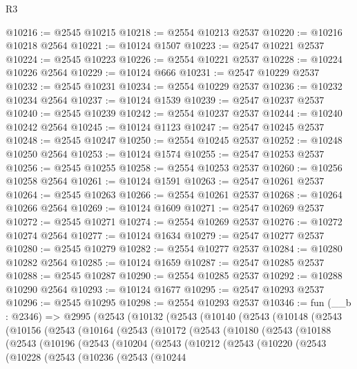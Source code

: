 \begin{lexlean}{R3}
\begin{coremodule}
@10216 := @2545 @10215
@10218 := @2554 @10213 @2537
@10220 := @10216 @10218 @2564
@10221 := @10124 @1507
@10223 := @2547 @10221 @2537
@10224 := @2545 @10223
@10226 := @2554 @10221 @2537
@10228 := @10224 @10226 @2564
@10229 := @10124 @666
@10231 := @2547 @10229 @2537
@10232 := @2545 @10231
@10234 := @2554 @10229 @2537
@10236 := @10232 @10234 @2564
@10237 := @10124 @1539
@10239 := @2547 @10237 @2537
@10240 := @2545 @10239
@10242 := @2554 @10237 @2537
@10244 := @10240 @10242 @2564
@10245 := @10124 @1123
@10247 := @2547 @10245 @2537
@10248 := @2545 @10247
@10250 := @2554 @10245 @2537
@10252 := @10248 @10250 @2564
@10253 := @10124 @1574
@10255 := @2547 @10253 @2537
@10256 := @2545 @10255
@10258 := @2554 @10253 @2537
@10260 := @10256 @10258 @2564
@10261 := @10124 @1591
@10263 := @2547 @10261 @2537
@10264 := @2545 @10263
@10266 := @2554 @10261 @2537
@10268 := @10264 @10266 @2564
@10269 := @10124 @1609
@10271 := @2547 @10269 @2537
@10272 := @2545 @10271
@10274 := @2554 @10269 @2537
@10276 := @10272 @10274 @2564
@10277 := @10124 @1634
@10279 := @2547 @10277 @2537
@10280 := @2545 @10279
@10282 := @2554 @10277 @2537
@10284 := @10280 @10282 @2564
@10285 := @10124 @1659
@10287 := @2547 @10285 @2537
@10288 := @2545 @10287
@10290 := @2554 @10285 @2537
@10292 := @10288 @10290 @2564
@10293 := @10124 @1677
@10295 := @2547 @10293 @2537
@10296 := @2545 @10295
@10298 := @2554 @10293 @2537
@10346 := fun (__b : @2346) =>
  @2995
    (@2543
      (@10132
        (@2543
          (@10140
            (@2543
              (@10148
                (@2543
                  (@10156
                    (@2543
                      (@10164
                        (@2543
                          (@10172
                            (@2543
                              (@10180
                                (@2543
                                  (@10188
                                    (@2543
                                      (@10196
                                        (@2543
                                          (@10204
                                            (@2543
                                              (@10212
                                                (@2543
                                                  (@10220
                                                    (@2543
                                                      (@10228
                                                        (@2543
                                                          (@10236
                                                            (@2543
                                                              (@10244

\end{coremodule}
\end{lexlean}
